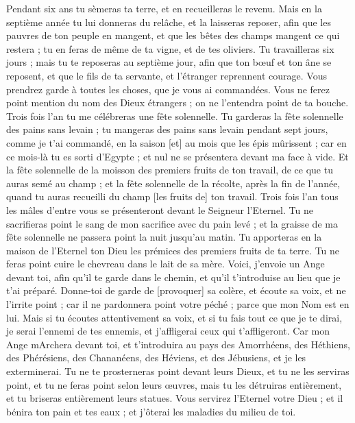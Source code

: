 \begin{multicols}{2}
Pendant six ans tu sèmeras ta terre, et en recueilleras le revenu.
Mais en la septième année tu lui donneras du relâche, et la laisseras reposer, afin que les pauvres de ton peuple en mangent, et que les bêtes des champs mangent ce qui restera ; tu en feras de même de ta vigne, et de tes oliviers.
Tu travailleras six jours ; mais tu te reposeras au septième jour, afin que ton bœuf et ton âne se reposent, et que le fils de ta servante, et l'étranger reprennent courage.
Vous prendrez garde à toutes les choses, que je vous ai commandées. Vous ne ferez point mention du nom des Dieux étrangers ; on ne l'entendra point de ta bouche.
Trois fois l'an tu me célébreras une fête solennelle.
Tu garderas la fête solennelle des pains sans levain ; tu mangeras des pains sans levain pendant sept jours, comme je t'ai commandé, en la saison [et] au mois que les épis mûrissent ; car en ce mois-là tu es sorti d'Egypte ; et nul ne se présentera devant ma face à vide.
Et la fête solennelle de la moisson des premiers fruits de ton travail, de ce que tu auras semé au champ ; et la fête solennelle de la récolte, après la fin de l'année, quand tu auras recueilli du champ [les fruits de] ton travail.
Trois fois l'an tous les mâles d'entre vous se présenteront devant le Seigneur l'Eternel.
Tu ne sacrifieras point le sang de mon sacrifice avec du pain levé ; et la graisse de ma fête solennelle ne passera point la nuit jusqu'au matin.
Tu apporteras en la maison de l'Eternel ton Dieu les prémices des premiers fruits de ta terre. Tu ne feras point cuire le chevreau dans le lait de sa mère.
Voici, j'envoie un Ange devant toi, afin qu'il te garde dans le chemin, et qu'il t'introduise au lieu que je t'ai préparé.
Donne-toi de garde de [provoquer] sa colère, et écoute sa voix, et ne l'irrite point ; car il ne pardonnera point votre péché ; parce que mon Nom est en lui.
Mais si tu écoutes attentivement sa voix, et si tu fais tout ce que je te dirai, je serai l'ennemi de tes ennemis, et j'affligerai ceux qui t'affligeront.
Car mon Ange mArchera devant toi, et t'introduira au pays des Amorrhéens, des Héthiens, des Phérésiens, des Chananéens, des Héviens, et des Jébusiens, et je les exterminerai.
Tu ne te prosterneras point devant leurs Dieux, et tu ne les serviras point, et tu ne feras point selon leurs œuvres, mais tu les détruiras entièrement, et tu briseras entièrement leurs statues.
Vous servirez l'Eternel votre Dieu ; et il bénira ton pain et tes eaux ; et j'ôterai les maladies du milieu de toi.

\end{multicols}
